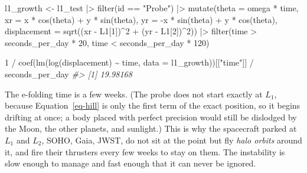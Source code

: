 \documentclass[
  10.5pt,
  letterpaper,
]{scrbook}
\newenvironment{Shaded}{\begin{snugshade}}{\end{snugshade}}
\newcommand{\AttributeTok}[1]{\textcolor[rgb]{0.00,0.00,0.00}{#1}}
\newcommand{\CommentTok}[1]{\textcolor[rgb]{0.00,0.00,0.00}{\textit{#1}}}
\newcommand{\DecValTok}[1]{\textcolor[rgb]{0.00,0.00,0.00}{#1}}
\newcommand{\FunctionTok}[1]{\textcolor[rgb]{0.00,0.00,0.00}{#1}}
\newcommand{\NormalTok}[1]{\textcolor[rgb]{0.00,0.00,0.00}{#1}}
\newcommand{\OtherTok}[1]{\textcolor[rgb]{0.00,0.00,0.00}{#1}}
\newcommand{\SpecialCharTok}[1]{\textcolor[rgb]{0.00,0.00,0.00}{#1}}
\newcommand{\StringTok}[1]{\textcolor[rgb]{0.00,0.00,0.00}{#1}}
\theoremstyle{plain}
\theoremstyle{remark}
\begin{document}
\begin{Shaded}
\begin{Highlighting}[]
\NormalTok{l1\_growth }\OtherTok{\textless{}{-}}\NormalTok{ l1\_test }\SpecialCharTok{|\textgreater{}}
  \FunctionTok{filter}\NormalTok{(id }\SpecialCharTok{==} \StringTok{"Probe"}\NormalTok{) }\SpecialCharTok{|\textgreater{}}
  \FunctionTok{mutate}\NormalTok{(}\AttributeTok{theta =}\NormalTok{ omega }\SpecialCharTok{*}\NormalTok{ time,}
         \AttributeTok{xr =}\NormalTok{  x }\SpecialCharTok{*} \FunctionTok{cos}\NormalTok{(theta) }\SpecialCharTok{+}\NormalTok{ y }\SpecialCharTok{*} \FunctionTok{sin}\NormalTok{(theta),}
         \AttributeTok{yr =} \SpecialCharTok{{-}}\NormalTok{x }\SpecialCharTok{*} \FunctionTok{sin}\NormalTok{(theta) }\SpecialCharTok{+}\NormalTok{ y }\SpecialCharTok{*} \FunctionTok{cos}\NormalTok{(theta),}
         \AttributeTok{displacement =} \FunctionTok{sqrt}\NormalTok{((xr }\SpecialCharTok{{-}}\NormalTok{ L1[}\DecValTok{1}\NormalTok{])}\SpecialCharTok{\^{}}\DecValTok{2} \SpecialCharTok{+}\NormalTok{ (yr }\SpecialCharTok{{-}}\NormalTok{ L1[}\DecValTok{2}\NormalTok{])}\SpecialCharTok{\^{}}\DecValTok{2}\NormalTok{)) }\SpecialCharTok{|\textgreater{}}
  \FunctionTok{filter}\NormalTok{(time }\SpecialCharTok{\textgreater{}}\NormalTok{ seconds\_per\_day }\SpecialCharTok{*} \DecValTok{20}\NormalTok{, time }\SpecialCharTok{\textless{}}\NormalTok{ seconds\_per\_day }\SpecialCharTok{*} \DecValTok{120}\NormalTok{)}

\DecValTok{1} \SpecialCharTok{/} \FunctionTok{coef}\NormalTok{(}\FunctionTok{lm}\NormalTok{(}\FunctionTok{log}\NormalTok{(displacement) }\SpecialCharTok{\textasciitilde{}}\NormalTok{ time, }\AttributeTok{data =}\NormalTok{ l1\_growth))[[}\StringTok{"time"}\NormalTok{]] }\SpecialCharTok{/}\NormalTok{ seconds\_per\_day}
\CommentTok{\#\textgreater{} [1] 19.98168}
\end{Highlighting}
\end{Shaded}

The e-folding time is a few weeks. (The probe does not start exactly at
\(L_1\), because Equation~\ref{eq-hill} is only the first term of the
exact position, so it begins drifting at once; a body placed with
perfect precision would still be dislodged by the Moon, the other
planets, and sunlight.) This is why the spacecraft parked at \(L_1\) and
\(L_2\), SOHO, Gaia, JWST, do not sit at the point but fly \emph{halo
orbits} around it, and fire their thrusters every few weeks to stay on
them. The instability is slow enough to manage and fast enough that it
can never be ignored.
\end{document}
